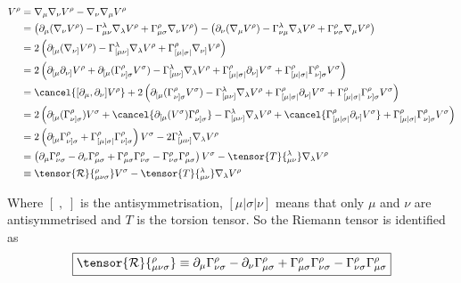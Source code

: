 \begin{align*}
[\nabla_\mu,\nabla_\nu]V^\rho &= \nabla_\mu\nabla_\nu V^\rho - \nabla_\nu\nabla_\mu V^\rho \\
&= \left(\partial_\mu(\nabla_\nu V^\rho) - \Gamma^\lambda_{\mu\nu}\nabla_\lambda V^\rho + \Gamma^\rho_{\mu\sigma}\nabla_\nu V^\rho \right) - \left(\partial_\nu(\nabla_\mu V^\rho) - \Gamma^\lambda_{\nu\mu}\nabla_\lambda V^\rho + \Gamma^\rho_{\nu\sigma}\nabla_\mu V^\rho \right) \\
&= 2\left(\partial_{[\mu}(\nabla_{\nu]} V^\rho) - \Gamma^\lambda_{[\mu\nu]}\nabla_\lambda V^\rho + \Gamma^\rho_{[\mu|\sigma|}\nabla_{\nu]} V^\rho \right) \\
&= 2\left(\partial_{[\mu}\partial_{\nu]} V^\rho + \partial_{[\mu}(\Gamma^\rho_{\nu]\sigma} V^\sigma) - \Gamma^\lambda_{[\mu\nu]}\nabla_\lambda V^\rho + \Gamma^\rho_{[\mu|\sigma|}\partial_{\nu]} V^\sigma + \Gamma^\rho_{[\mu|\sigma|}\Gamma^\rho_{\nu]\sigma} V^\sigma \right) \\
&= \cancel{[\partial_{\mu}, \partial_{\nu}] V^\rho} + 2\left(\partial_{[\mu}(\Gamma^\rho_{\nu]\sigma} V^\sigma) - \Gamma^\lambda_{[\mu\nu]}\nabla_\lambda V^\rho + \Gamma^\rho_{[\mu|\sigma|}\partial_{\nu]} V^\sigma + \Gamma^\rho_{[\mu|\sigma|}\Gamma^\rho_{\nu]\sigma} V^\sigma \right) \\
&= 2\left(\partial_{[\mu}(\Gamma^\rho_{\nu]\sigma}) V^\sigma + \cancel{\partial_{[\mu}( V^\sigma)\Gamma^\rho_{\nu]\sigma}} - \Gamma^\lambda_{[\mu\nu]}\nabla_\lambda V^\rho + \cancel{\Gamma^\rho_{[\mu|\sigma|}\partial_{\nu]} V^\sigma} + \Gamma^\rho_{[\mu|\sigma|}\Gamma^\rho_{\nu]\sigma} V^\sigma \right) \\
&= 2\left(\partial_{[\mu}\Gamma^\rho_{\nu]\sigma} + \Gamma^\rho_{[\mu|\sigma|}\Gamma^\rho_{\nu]\sigma} \right) V^\sigma - 2\Gamma^\lambda_{[\mu\nu]}\nabla_\lambda V^\rho \\
&= \left(\partial_{\mu}\Gamma^\rho_{\nu\sigma} - \partial_{\nu}\Gamma^\rho_{\mu\sigma} + \Gamma^\rho_{\mu\sigma}\Gamma^\rho_{\nu\sigma} - \Gamma^\rho_{\nu\sigma}\Gamma^\rho_{\mu\sigma} \right) V^\sigma - \tensor{T}{^\lambda_{\mu\nu}}\nabla_\lambda V^\rho \\
&\equiv \tensor{\mathcal{R}}{^\rho_{\mu\nu\sigma}}V^\sigma - \tensor{T}{^\lambda_{\mu\nu}}\nabla_\lambda V^\rho
\end{align*}

Where $[\;,\;]$ is the antisymmetrisation, $[\mu|\sigma|\nu]$ means that only $\mu$ and $\nu$ are antisymmetrised and $T$ is the torsion tensor. So the Riemann tensor is identified as
\[ \boxed{\tensor{\mathcal{R}}{^\rho_{\mu\nu\sigma}} \equiv \partial_{\mu}\Gamma^\rho_{\nu\sigma} - \partial_{\nu}\Gamma^\rho_{\mu\sigma} + \Gamma^\rho_{\mu\sigma}\Gamma^\rho_{\nu\sigma} - \Gamma^\rho_{\nu\sigma}\Gamma^\rho_{\mu\sigma}} \]

